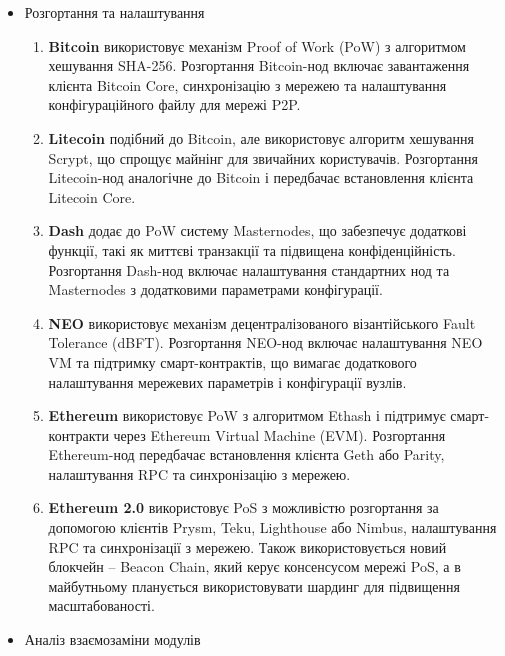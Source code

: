 \begin{itemize}
    \item Розгортання та налаштування
    \vspace{0.25cm}
    \begin{enumerate}
        \item \textbf{Bitcoin} використовує механізм Proof of Work (PoW) з алгоритмом хешування SHA-256. Розгортання Bitcoin-нод включає завантаження клієнта Bitcoin Core, синхронізацію з мережею та налаштування конфігураційного файлу для мережі P2P.
        \item \textbf{Litecoin} подібний до Bitcoin, але використовує алгоритм хешування Scrypt, що спрощує майнінг для звичайних користувачів. Розгортання Litecoin-нод аналогічне до Bitcoin і передбачає встановлення клієнта Litecoin Core.
        \item \textbf{Dash} додає до PoW систему Masternodes, що забезпечує додаткові функції, такі як миттєві транзакції та підвищена конфіденційність. Розгортання Dash-нод включає налаштування стандартних нод та Masternodes з додатковими параметрами конфігурації.
        \item \textbf{NEO} використовує механізм децентралізованого візантійського Fault Tolerance (dBFT). Розгортання NEO-нод включає налаштування NEO VM та підтримку смарт-контрактів, що вимагає додаткового налаштування мережевих параметрів і конфігурації вузлів.
        \item \textbf{Ethereum} використовує PoW з алгоритмом Ethash і підтримує смарт-контракти через Ethereum Virtual Machine (EVM). Розгортання Ethereum-нод передбачає встановлення клієнта Geth або Parity, налаштування RPC та синхронізацію з мережею.
        \item \textbf{Ethereum 2.0} використовує PoS з можливістю розгортання за допомогою клієнтів Prysm, Teku, Lighthouse або Nimbus, налаштування RPC та синхронізації з мережею. Також використовується новий блокчейн -- Beacon Chain, який керує консенсусом мережі PoS, а в майбутньому планується використовувати шардинг для підвищення масштабованості.
    \end{enumerate}

    \vspace{0.5cm}
    \item Аналіз взаємозаміни модулів
    

\end{itemize}
